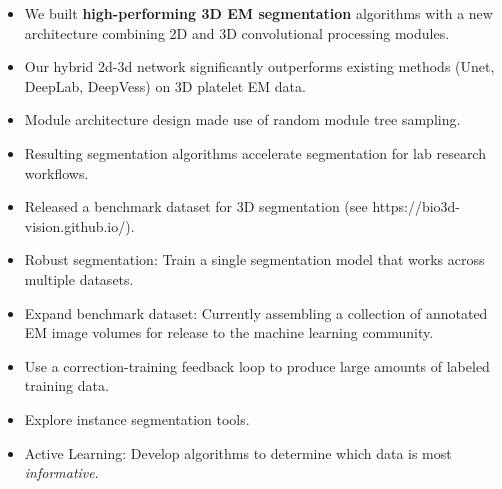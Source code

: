 \documentclass[final]{beamer}
\newlength{\onecolwid}
\renewcommand{\emph}[1]{{\color{nibib2} #1}}
\begin{document}
\begin{frame}[t]
\begin{columns}[t]
\begin{column}{\onecolwid}
    \begin{tcolorbox}[title=Summary of Results]
        \begin{itemize}
            \item We built \textbf{high-performing 3D EM segmentation} algorithms with a new architecture combining 2D and 3D convolutional processing modules.
            \item Our hybrid 2d-3d network significantly outperforms existing methods (Unet, DeepLab, DeepVess) on 3D platelet EM data. 
            \item Module architecture design made use of \emph{random module tree} sampling. %
            \item Resulting segmentation algorithms \emph{accelerate segmentation} for lab research workflows.
            \item Released a benchmark dataset for 3D segmentation (see \emph{https://bio3d-vision.github.io/}).  
        \end{itemize}
    \end{tcolorbox}
    
    \begin{tcolorbox}[title=Future Work]
        \begin{itemize}
            \item \emph{Robust segmentation}: Train a single segmentation model that works across multiple datasets. %
            \item \emph{Expand benchmark dataset}: Currently assembling a collection of annotated EM image volumes for release to the machine learning community.
            \item Use a \emph{correction-training feedback loop} to produce large amounts of labeled training data.
            \item Explore \emph{instance} segmentation tools.
            \item \emph{Active Learning:} Develop algorithms to determine which data is most \textit{informative}. 
        \end{itemize}
    \end{tcolorbox}
    

\end{column}
\end{columns}
\end{frame}
\end{document}
